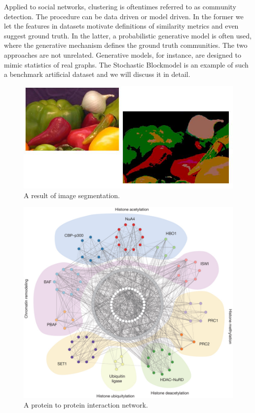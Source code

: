 Applied to social networks, clustering is oftentimes referred to as community detection. The procedure can be data driven or model driven.  In the former we let the  features in datasets motivate definitions of similarity metrics and even suggest ground truth.  In the latter, a probabilistic generative model is often used, where the generative mechanism defines the ground truth communities.  The two approaches are not unrelated.  Generative models, for instance, are designed to mimic statistics of real graphs.  The Stochastic Blockmodel is an example of such a benchmark artificial dataset and we will discuss it in detail.  




\begin{figure}
\begin{center}
  \includegraphics[scale=0.35]{image_segmentation.jpg}
  \caption{A result of image segmentation.\cite{image_seg}}
  \label{fig:seg}
 \end{center}
\end{figure}

\begin{figure}
\begin{center}
  \includegraphics[scale=0.20]{protien_network.jpg}
  \caption{A protein to protein interaction network.\cite{protein}}
  \label{fig:protien}
 \end{center}
\end{figure}



